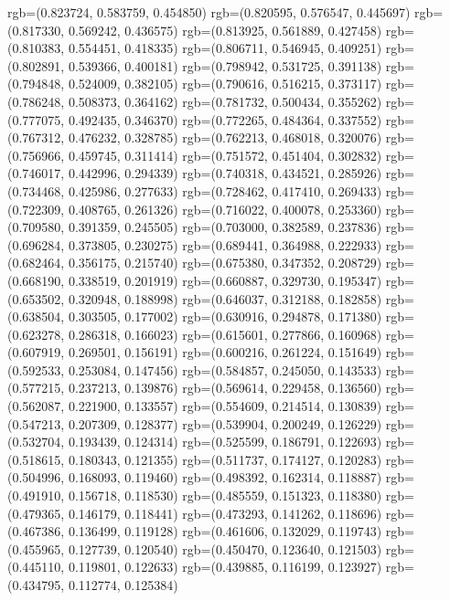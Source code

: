 {{{					rgb=(0.823724, 0.583759, 0.454850)
					rgb=(0.820595, 0.576547, 0.445697)
					rgb=(0.817330, 0.569242, 0.436575)
					rgb=(0.813925, 0.561889, 0.427458)
					rgb=(0.810383, 0.554451, 0.418335)
					rgb=(0.806711, 0.546945, 0.409251)
					rgb=(0.802891, 0.539366, 0.400181)
					rgb=(0.798942, 0.531725, 0.391138)
					rgb=(0.794848, 0.524009, 0.382105)
					rgb=(0.790616, 0.516215, 0.373117)
					rgb=(0.786248, 0.508373, 0.364162)
					rgb=(0.781732, 0.500434, 0.355262)
					rgb=(0.777075, 0.492435, 0.346370)
					rgb=(0.772265, 0.484364, 0.337552)
					rgb=(0.767312, 0.476232, 0.328785)
					rgb=(0.762213, 0.468018, 0.320076)
					rgb=(0.756966, 0.459745, 0.311414)
					rgb=(0.751572, 0.451404, 0.302832)
					rgb=(0.746017, 0.442996, 0.294339)
					rgb=(0.740318, 0.434521, 0.285926)
					rgb=(0.734468, 0.425986, 0.277633)
					rgb=(0.728462, 0.417410, 0.269433)
					rgb=(0.722309, 0.408765, 0.261326)
					rgb=(0.716022, 0.400078, 0.253360)
					rgb=(0.709580, 0.391359, 0.245505)
					rgb=(0.703000, 0.382589, 0.237836)
					rgb=(0.696284, 0.373805, 0.230275)
					rgb=(0.689441, 0.364988, 0.222933)
					rgb=(0.682464, 0.356175, 0.215740)
					rgb=(0.675380, 0.347352, 0.208729)
					rgb=(0.668190, 0.338519, 0.201919)
					rgb=(0.660887, 0.329730, 0.195347)
					rgb=(0.653502, 0.320948, 0.188998)
					rgb=(0.646037, 0.312188, 0.182858)
					rgb=(0.638504, 0.303505, 0.177002)
					rgb=(0.630916, 0.294878, 0.171380)
					rgb=(0.623278, 0.286318, 0.166023)
					rgb=(0.615601, 0.277866, 0.160968)
					rgb=(0.607919, 0.269501, 0.156191)
					rgb=(0.600216, 0.261224, 0.151649)
					rgb=(0.592533, 0.253084, 0.147456)
					rgb=(0.584857, 0.245050, 0.143533)
					rgb=(0.577215, 0.237213, 0.139876)
					rgb=(0.569614, 0.229458, 0.136560)
					rgb=(0.562087, 0.221900, 0.133557)
					rgb=(0.554609, 0.214514, 0.130839)
					rgb=(0.547213, 0.207309, 0.128377)
					rgb=(0.539904, 0.200249, 0.126229)
					rgb=(0.532704, 0.193439, 0.124314)
					rgb=(0.525599, 0.186791, 0.122693)
					rgb=(0.518615, 0.180343, 0.121355)
					rgb=(0.511737, 0.174127, 0.120283)
					rgb=(0.504996, 0.168093, 0.119460)
					rgb=(0.498392, 0.162314, 0.118887)
					rgb=(0.491910, 0.156718, 0.118530)
					rgb=(0.485559, 0.151323, 0.118380)
					rgb=(0.479365, 0.146179, 0.118441)
					rgb=(0.473293, 0.141262, 0.118696)
					rgb=(0.467386, 0.136499, 0.119128)
					rgb=(0.461606, 0.132029, 0.119743)
					rgb=(0.455965, 0.127739, 0.120540)
					rgb=(0.450470, 0.123640, 0.121503)
					rgb=(0.445110, 0.119801, 0.122633)
					rgb=(0.439885, 0.116199, 0.123927)
					rgb=(0.434795, 0.112774, 0.125384)
}}}
